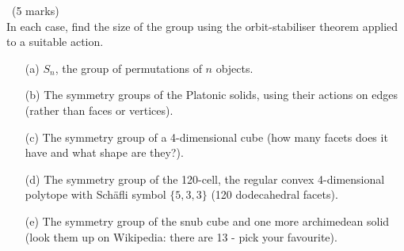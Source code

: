 \documentclass[12pt]{article}
\begin{document}
\begin{question}\ (5 marks)\\
  In each case, find the size of the group using the orbit-stabiliser theorem applied to a suitable action.
  \begin{enumerate}
  \item[(a)] $S_n$, the group of permutations of $n$ objects.
  \item[(b)] The symmetry groups of the Platonic solids, using their actions on edges (rather than faces or vertices).
  \item[(c)] The symmetry group of a 4-dimensional cube (how many facets does it have and what shape are they?).
  \item[(d)] The symmetry group of the 120-cell, the regular convex 4-dimensional polytope with Sch\"afli symbol $\{5,3,3\}$ (120 dodecahedral facets).
  \item[(e)] The symmetry group of the snub cube and one more archimedean solid (look them up on Wikipedia: there are 13 - pick your favourite).
  \end{enumerate}
\end{question}
\end{document}
